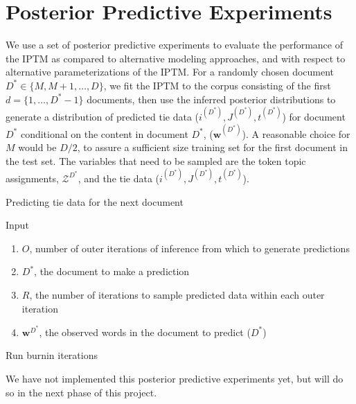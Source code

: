 \documentclass[a4paper]{article}
\begin{document}
     \section{Posterior Predictive Experiments} \label{sec:PosteriorPredictive}
 We use a set of posterior predictive experiments to evaluate the performance of the IPTM as compared to alternative modeling approaches, and with respect to alternative parameterizations of the IPTM. For a randomly chosen document $D^* \in \{M,M+1,\hdots,D\}$, we fit the IPTM to the corpus consisting of the first $d = \{1,\hdots,D^*-1\}$ documents, then use the inferred posterior distributions to generate a distribution of predicted tie data ($i^{(D^*)}, J^{(D^*)}, t^{(D^*)}$) for document $D^*$ conditional on the content in document $D^*$, ($\boldsymbol{w}^{(D^*)}$).  A reasonable choice for $M$ would be $D/2$, to assure a sufficient size training set for the first document in the test set. The variables that need to be sampled are the token topic assignments, $\mathcal{Z}^{D^*}$, and the tie data ($i^{(D^*)}, J^{(D^*)}, t^{(D^*)}$). 
 \begin{algorithm}[H]
	\SetAlgoLined
	\caption{Predicting tie data for the next document}
	
	Input
	\begin{enumerate}
	\item $O$, number of outer iterations of inference from which to generate predictions
	\item $D^*$, the document to make a prediction
	\item $R$, the number of iterations to sample predicted data within each outer iteration
	\item $\boldsymbol{w}^{D^*}$, the observed words in the document to predict ($D^*$)
	\end{enumerate}
	Run burnin iterations\\
\end{algorithm}
We have not implemented this posterior predictive experiments yet, but will do so in the next phase of this project.
\end{document}
